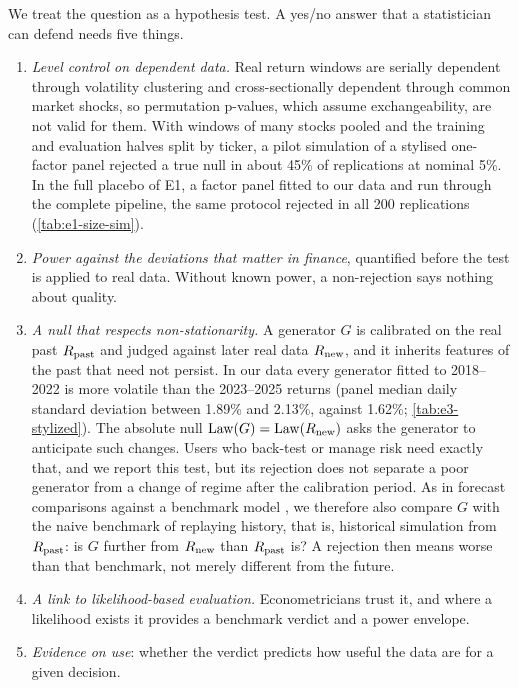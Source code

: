 We treat the question as a hypothesis test. A yes/no answer that a statistician can defend needs
five things.
\begin{enumerate}
  \item[(i)] \emph{Level control on dependent data.} Real return windows are serially dependent
  through volatility clustering and cross-sectionally dependent through common market shocks, so
  permutation p-values, which assume exchangeability, are not valid for them. With windows of many
  stocks pooled and the training and evaluation halves split by ticker, a pilot simulation of a
  stylised one-factor panel rejected a true null in about 45\% of replications at nominal 5\%. In
  the full placebo of E1, a factor panel fitted to our data and run through the complete pipeline,
  the same protocol rejected in all 200 replications (\cref{tab:e1-size-sim}).
  \item[(ii)] \emph{Power against the deviations that matter in finance}, quantified before the
  test is applied to real data. Without known power, a non-rejection says nothing about quality.
  \item[(iii)] \emph{A null that respects non-stationarity.} A generator $G$ is calibrated on the
  real past $R_{\mathrm{past}}$ and judged against later real data $R_{\mathrm{new}}$, and it inherits features of the
  past that need not persist. In our data every generator fitted to 2018--2022 is more volatile
  than the 2023--2025 returns (panel median daily standard deviation between 1.89\% and 2.13\%,
  against 1.62\%; \cref{tab:e3-stylized}). The absolute null $\operatorname{Law}(G)=\operatorname{Law}(R_{\mathrm{new}})$ asks the
  generator to anticipate such changes. Users who back-test or manage risk need exactly that, and
  we report this test, but its rejection does not separate a poor generator from a change of
  regime after the calibration period. As in forecast comparisons against a benchmark model
  \citep{diebold1995comparing,giacomini2006tests}, we therefore also compare $G$ with the naive
  benchmark of replaying history, that is, historical simulation from $R_{\mathrm{past}}$: is $G$ further from
  $R_{\mathrm{new}}$ than $R_{\mathrm{past}}$ is? A rejection then means worse than that benchmark, not merely different
  from the future.
  \item[(iv)] \emph{A link to likelihood-based evaluation.} Econometricians trust it, and where a
  likelihood exists it provides a benchmark verdict and a power envelope.
  \item[(v)] \emph{Evidence on use}: whether the verdict predicts how useful the data are for a
  given decision.
\end{enumerate}

